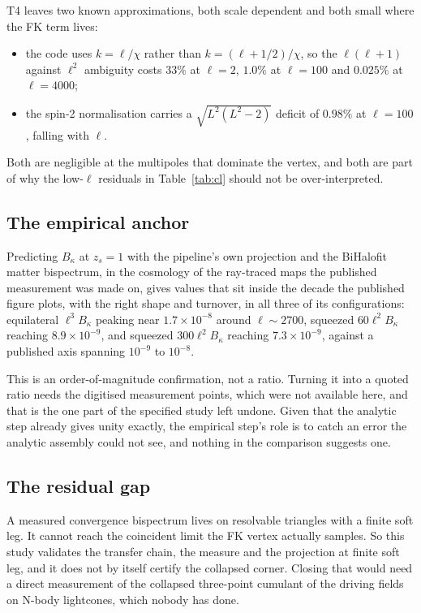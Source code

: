 T4 leaves two known approximations, both scale dependent and both small
where the FK term lives:

\begin{itemize}
\item the code uses $k=\ell/\chi$ rather than $k=(\ell+1/2)/\chi$, so the
$\ell(\ell+1)$ against $\ell^2$ ambiguity costs $33\%$ at $\ell=2$, $1.0\%$
at $\ell=100$ and $0.025\%$ at $\ell=4000$;
\item the spin-2 normalisation carries a $\sqrt{L^2(L^2-2)}$ deficit of
$0.98\%$ at $\ell=100$, falling with $\ell$.
\end{itemize}

Both are negligible at the multipoles that dominate the vertex, and both
are part of why the low-$\ell$ residuals in Table~\ref{tab:cl} should not
be over-interpreted.

\subsection{The empirical anchor}

Predicting $B_\kappa$ at $z_s=1$ with the pipeline's own projection and the
BiHalofit matter bispectrum, in the cosmology of the ray-traced maps the
published measurement was made on, gives values that sit inside the decade
the published figure plots, with the right shape and turnover, in all three
of its configurations: equilateral $\ell^3B_\kappa$ peaking near
$1.7\times10^{-8}$ around $\ell\sim2700$, squeezed $60\ell^2B_\kappa$
reaching $8.9\times10^{-9}$, and squeezed $300\ell^2B_\kappa$ reaching
$7.3\times10^{-9}$, against a published axis spanning $10^{-9}$ to
$10^{-8}$.

This is an order-of-magnitude confirmation, not a ratio. Turning it into a
quoted ratio needs the digitised measurement points, which were not
available here, and that is the one part of the specified study left
undone. Given that the analytic step already gives unity exactly, the
empirical step's role is to catch an error the analytic assembly could not
see, and nothing in the comparison suggests one.

\subsection{The residual gap}

A measured convergence bispectrum lives on resolvable triangles with a
finite soft leg. It cannot reach the coincident limit the FK vertex
actually samples. So this study validates the transfer chain, the measure
and the projection at finite soft leg, and it does not by itself certify
the collapsed corner. Closing that would need a direct measurement of the
collapsed three-point cumulant of the driving fields on N-body lightcones,
which nobody has done.

